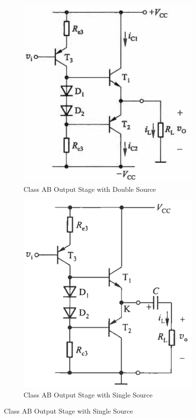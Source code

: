 \begin{figure}[H]
  \centering
  \begin{subfigure}{.45\textwidth}
    \centering
    \includegraphics[width=\linewidth]{figures/Power-AB-Ex1}
    \caption{Class AB Output Stage with Double Source}
  \end{subfigure}
  \begin{subfigure}{.45\textwidth}
    \centering
    \includegraphics[width=\linewidth]{figures/Power-AB-Ex2}
    \caption{Class AB Output Stage with Single Source}
  \end{subfigure}
\end{figure}

